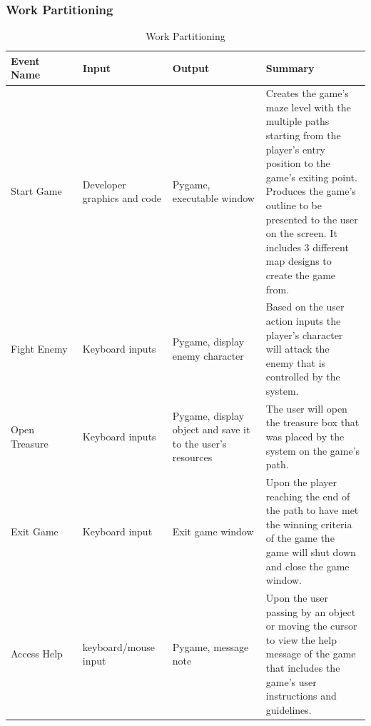 \documentclass[12pt, titlepage]{article}
\begin{document}
\subsubsection{Work Partitioning}

\begin{longtable}{|p{0.2\linewidth}|p{0.25\linewidth}|p{0.26\linewidth}|p{0.3\linewidth}|}
    \caption{Work Partitioning}
    \\
    \hline
	Event Name & Input & Output & Summary\\
	\hline
    Start Game & Developer graphics and code & Pygame, executable window & Creates the game's maze level with the multiple paths starting from the player's entry position to the game's exiting point. Produces the game's outline to be presented to the user on the screen. It includes 3 different map designs to create the game from.\\
	\hline
	Fight Enemy & Keyboard inputs & Pygame, display enemy character & Based on the user action inputs the player's character will attack the enemy that is controlled by the system.\\
	\hline
	Open Treasure & Keyboard inputs & Pygame, display object and save it to the user's resources & The user will open the treasure box that was placed by the system on the game's path.\\
	\hline
	Exit Game & Keyboard input & Exit game window & Upon the player reaching the end of the path to have met the winning criteria of the game the game will shut down and close the game window.\\
	\hline
	Access Help & keyboard/mouse input & Pygame, message note & Upon the user passing by an object or moving the cursor to view the help message of the game that includes the game's user instructions and guidelines.\\

\end{longtable}
\end{document}
